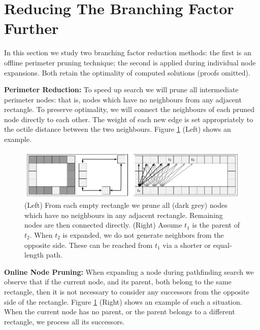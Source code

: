 \section{Reducing The Branching Factor Further}
In this section we study two branching factor reduction methods: the first
is an offline perimeter pruning technique; the second is 
applied during individual node expansions.
Both retain the optimality of computed solutions (proofs omitted).

\noindent
\textbf{Perimeter Reduction:}
To speed up search we will prune all intermediate perimeter nodes: that is, nodes
which have no neighbours from any adjacent rectangle.
To preserve optimality, we will
connect the neighbours of each pruned node directly to each other.  The weight
of each new edge is set appropriately to the octile distance between the two
neighbours.  Figure \ref{fig-branching} (Left) shows an example.  

\begin{figure}[t]
	\begin{center}
	\includegraphics[width=0.97\columnwidth, trim = 10mm 10mm 10mm 0mm]
	{diagrams/branching_wide.png}
	\end{center}
	\vspace{-3pt}
	\caption{(Left) From each empty rectangle we prune all (dark grey) nodes which
	have no neighbours in any adjacent rectangle.
	Remaining nodes are then connected directly.
	(Right) Assume $t_{1}$ is the parent of $t_2$. When $t_2$
	is expanded, we do not generate neighbors from the opposite side.
	These can be reached from $t_1$ via a shorter or equal-length path.
}
\label{fig-branching}
\end{figure}

\noindent
\textbf{Online Node Pruning:}
When expanding a node during pathfinding search we observe that if the current
node, and its parent, both belong to the same rectangle, then it is not
necessary to consider any successors from the opposite side of the rectangle.
Figure \ref{fig-branching} (Right) shows an example of such a situation. 
When the current node has no parent, or the parent belongs to a different rectangle, 
we process all its successors.
